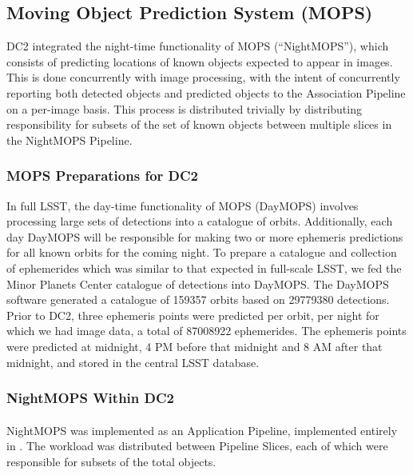 
\subsection{Moving Object Prediction System (MOPS)}
\label{sApps-mops}

DC2 integrated the night-time functionality of MOPS (``NightMOPS''),
which consists of predicting locations of known objects expected to
appear in images.  This is done concurrently with image processing,
with the intent of concurrently reporting both detected objects and
predicted objects to the Association Pipeline on a per-image basis.
This process is distributed trivially by distributing responsibility
for subsets of the set of known objects between multiple slices in the
NightMOPS Pipeline.

\subsubsection{MOPS Preparations for DC2}
In full LSST, the day-time functionality of MOPS (DayMOPS) involves
processing large sets of detections into a catalogue of orbits.
Additionally, each day DayMOPS will be responsible for making two or
more ephemeris predictions for all known orbits for the coming night.
To prepare a catalogue and collection of ephemerides which was similar
to that expected in full-scale LSST, we fed the Minor Planets Center
catalogue of detections into DayMOPS.  The DayMOPS software generated
a catalogue of 159357 orbits based on 29779380 detections.  Prior to
DC2, three ephemeris points were predicted per orbit, per night for
which we had image data, a total of 87008922 ephemerides.  The
ephemeris points were predicted at midnight, 4 PM before that midnight
and 8 AM after that midnight, and stored in the central LSST database.

\subsubsection{NightMOPS Within DC2}

\paragraph{}
NightMOPS was implemented as an Application Pipeline, implemented
entirely in .  The workload was distributed between
Pipeline Slices, each of which were responsible for subsets of the
total objects.

